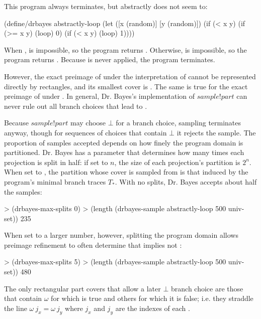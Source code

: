 This program always terminates, but abstractly does not seem to:
\begin{center}\singlespacing
\begin{schemedisplay}
(define/drbayes abstractly-loop
  (let ([x (random)]
        [y (random)])
    (if (< x y)
        (if (>= x y) (loop) 0)
        (if (< x y) (loop) 1))))
\end{schemedisplay}
\end{center}
When ,  is impossible, so the program returns .
Otherwise,  is impossible, so the program returns .
Because  is never applied, the program terminates.

However, the exact preimage of  under the interpretation of  cannot be represented directly by rectangles, and its smallest cover is .
The same is true for the exact preimage of  under .
In general, Dr. Bayes's implementation of $sample!part$ can never rule out all branch choices that lead to .

Because $sample!part$ may choose $\bot$ for a branch choice, sampling terminates anyway, though for sequences of choices that contain $\bot$ it rejects the sample.
The proportion of samples accepted depends on how finely the program domain is partitioned.
Dr. Bayes has a parameter  that determines how many times each projection is split in half: if set to $n$, the size of each projection's partition is $2^n$.
When set to , the partition whose cover is sampled from is that induced by the program's minimal branch traces $T_*$.
With no splits, Dr. Bayes accepts about half the samples:
\begin{center}\singlespacing
\begin{schemedisplay}
> (drbayes-max-splits 0)
> (length (drbayes-sample abstractly-loop 500 univ-set))
235
\end{schemedisplay}
\end{center}
When set to a larger number, however, splitting the program domain allows preimage refinement to often determine that  implies not :
\begin{center}\singlespacing
\begin{schemedisplay}
> (drbayes-max-splits 5)
> (length (drbayes-sample abstractly-loop 500 univ-set))
480
\end{schemedisplay}
\end{center}
The only rectangular part covers that allow a later $\bot$ branch choice are those that contain $\omega$ for which  is true and others for which it is false; i.e. they straddle the line $\omega~j_x = \omega~j_y$ where $j_x$ and $j_y$ are the indexes of each .

